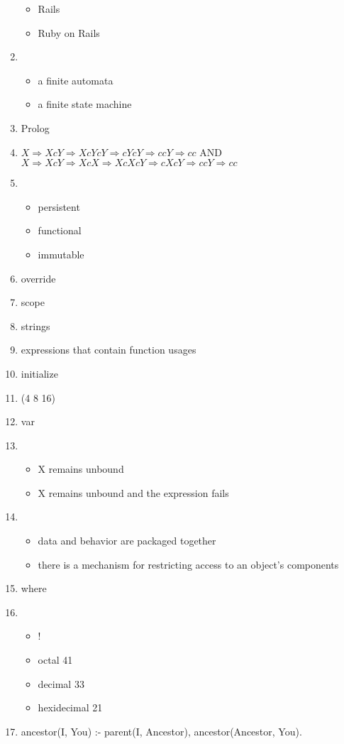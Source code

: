 \documentclass{exam}
\begin{document}
\begin{enumerate}
\begin{itemize}
\item Rails
\item Ruby on Rails
\end{itemize}
\item \begin{itemize}
\item a finite automata
\item a finite state machine
\end{itemize}
\item Prolog
\item $X \Rightarrow XcY \Rightarrow XcYcY \Rightarrow cYcY \Rightarrow ccY \Rightarrow cc$ AND $X \Rightarrow XcY \Rightarrow XcX \Rightarrow XcXcY \Rightarrow cXcY \Rightarrow ccY \Rightarrow cc$
\item \begin{itemize}
\item persistent
\item functional
\item immutable
\end{itemize}
\item override
\item scope
\item strings
\item expressions that contain function usages
\item initialize
\item (4 8 16)
\item var
\item \begin{itemize}
\item X remains unbound
\item X remains unbound and the expression fails
\end{itemize}
\item \begin{itemize}
\item data and behavior are packaged together
\item there is a mechanism for restricting access to an object's components
\end{itemize}
\item where
\item \begin{itemize}
\item !
\item octal 41
\item decimal 33
\item hexidecimal 21
\end{itemize}
\item ancestor(I, You) :- parent(I, Ancestor), ancestor(Ancestor, You). 

\end{enumerate}
\end{document}
